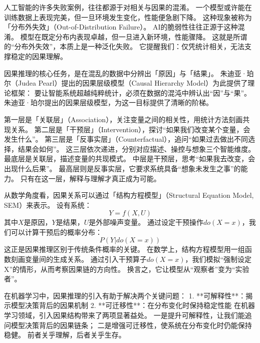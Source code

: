 人工智能的许多失败案例，往往都源于对相关与因果的混淆。
一个模型或许能在训练数据上表现完美，但一旦环境发生变化，性能便急剧下降。
这种现象被称为「分布外失效」（Out-of-Distribution Failure）。
AI的脆弱性往往正源于这种混淆。
模型在既定分布内表现卓越，但一旦进入新环境，性能骤降。
这就是所谓的“分布外失效”，本质上是一种泛化失败。
它提醒我们：仅凭统计相关，无法支撑稳定的因果理解。

因果推理的核心任务，是在混乱的数据中分辨出「原因」与「结果」。
朱迪亚·珀尔（Judea Pearl）提出的因果层级模型（Causal Hierarchy Model）为此提供了理论框架：
要让智能系统超越纯粹统计，必须在数据的混沌中辨认出“因”与“果”。
朱迪亚·珀尔提出的因果层级模型，为这一目标提供了清晰的阶梯。

第一层是「关联层」（Association），关注变量之间的相关性，用统计方法刻画共现关系。  
第二层是「干预层」（Intervention），探讨“如果我们改变某个变量，会发生什么”。  
第三层是「反事实层」（Counterfactual），追问“如果过去做出不同选择，结果会如何”。  
这三层依次递进，分别对应描述、操控与想象三个智能维度。
最底层是关联层，描述变量的共现模式。
中层是干预层，思考“如果我去改变，会出现什么后果”。
最高层则是反事实层，它要求系统具备“想象未发生之事”的能力。
只有在这一层，解释与理解才真正成为可能。

从数学角度看，因果关系可以通过「结构方程模型」（Structural Equation Model, SEM）来表示。
设有系统：
\begin{equation}
Y = f(X, U)
\end{equation}
其中$X$是原因，$Y$是结果，$U$是外部噪声变量。
通过设定干预操作$do(X=x)$，我们可以计算干预后的概率分布：
\begin{equation}
P(Y|do(X=x))
\end{equation}
这正是因果推理区别于传统条件概率的关键。
在数学上，结构方程模型用一组函数刻画变量间的生成关系。
通过引入干预算子$do(X=x)$，我们模拟“强制设定X”的情形，从而考察因果链的方向性。
换言之，它让模型从“观察者”变为“实验者”。

在机器学习中，因果推理的引入有助于解决两个关键问题：
1. **可解释性**：揭示模型决策背后的因果机制
2. **可迁移性**：在分布变化时保持稳定性能
在机器学习领域，引入因果结构带来了两项显著益处。
一是提升可解释性，让我们能追问模型决策背后的因果链条；
二是增强可迁移性，使系统在分布变化时仍能保持稳健。
前者关乎理解，后者关乎生存。

